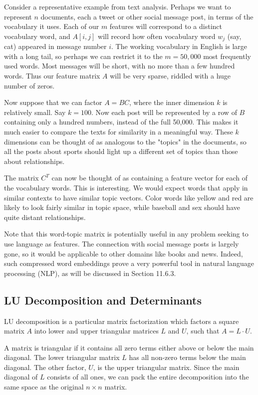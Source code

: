 \documentclass[10pt]{article}
\begin{document}
Consider a representative example from text analysis. Perhaps we want to represent \(n\) documents, each a tweet or other social message post, in terms of the vocabulary it uses. Each of our \(m\) features will correspond to a distinct vocabulary word, and \(A[i, j]\) will record how often vocabulary word \(w_{j}\) (say, cat) appeared in message number \(i\). The working vocabulary in English is large with a long tail, so perhaps we can restrict it to the \(m=50,000\) most frequently used words. Most messages will be short, with no more than a few hundred words. Thus our feature matrix \(A\) will be very sparse, riddled with a huge number of zeros.

Now suppose that we can factor \(A=B C\), where the inner dimension \(k\) is relatively small. Say \(k=100\). Now each post will be represented by a row of \(B\) containing only a hundred numbers, instead of the full 50,000. This makes it much easier to compare the texts for similarity in a meaningful way. These \(k\) dimensions can be thought of as analogous to the "topics" in the documents, so all the posts about sports should light up a different set of topics than those about relationships.

The matrix \(C^{T}\) can now be thought of as containing a feature vector for each of the vocabulary words. This is interesting. We would expect words that apply in similar contexts to have similar topic vectors. Color words like yellow and red are likely to look fairly similar in topic space, while baseball and sex should have quite distant relationships.

Note that this word-topic matrix is potentially useful in any problem seeking to use language as features. The connection with social message posts is largely gone, so it would be applicable to other domains like books and news. Indeed, such compressed word embeddings prove a very powerful tool in natural language processing (NLP), as will be discussed in Section 11.6.3.

\subsection*{LU Decomposition and Determinants}
LU decomposition is a particular matrix factorization which factors a square matrix \(A\) into lower and upper triangular matrices \(L\) and \(U\), such that \(A=L \cdot U\).

A matrix is triangular if it contains all zero terms either above or below the main diagonal. The lower triangular matrix \(L\) has all non-zero terms below the main diagonal. The other factor, \(U\), is the upper triangular matrix. Since the main diagonal of \(L\) consists of all ones, we can pack the entire decomposition into the same space as the original \(n \times n\) matrix.
\end{document}
